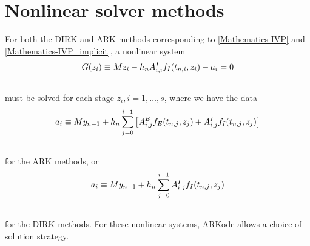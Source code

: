 \documentclass[letterpaper,10pt,english]{sphinxmanual}
\begin{document}
\section{Nonlinear solver methods}
\label{Mathematics:nonlinear-solver-methods}\label{Mathematics:mathematics-nonlinear}
For both the DIRK and ARK methods corresponding to \eqref{Mathematics-IVP} and
\eqref{Mathematics-IVP_implicit}, a nonlinear system
\label{Mathematics:equation-Residual}\begin{gather}
\begin{split}G(z_i) \equiv M z_i - h_n A^I_{i,i} f_I(t_{n,i}, z_i) - a_i = 0\end{split}\label{Mathematics-Residual}\\\begin{split}\end{split}\notag
\end{gather}
must be solved for each stage $z_i, i=1,\ldots,s$, where we have
the data
\begin{gather}
\begin{split}a_i \equiv M y_{n-1} + h_n \sum_{j=0}^{i-1} \left[
   A^E_{i,j} f_E(t_{n,j}, z_j) +
   A^I_{i,j} f_I(t_{n,j}, z_j) \right]\end{split}\notag\\\begin{split}\end{split}\notag
\end{gather}
for the ARK methods, or
\begin{gather}
\begin{split}a_i \equiv M y_{n-1} + h_n \sum_{j=0}^{i-1}
   A^I_{i,j} f_I(t_{n,j}, z_j)\end{split}\notag\\\begin{split}\end{split}\notag
\end{gather}
for the DIRK methods.  For these nonlinear systems, ARKode allows a
choice of solution strategy.
\end{document}
